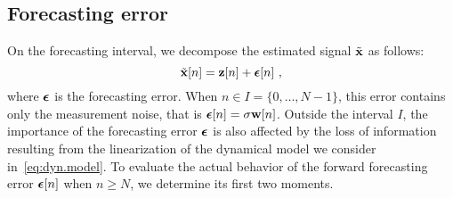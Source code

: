 \subsection{Forecasting error}
On the forecasting interval, we decompose the estimated signal $\tilde{{\mathbf x}}$ as follows:
\begin{equation}
\tilde \bx[n] = \bz[n] + \bepsilon[n]\ ,
\label{eq:forecasting.error}
\end{equation}
where $\boldsymbol{\epsilon}$ is the forecasting error. When $n\in I=\{0,\dots,N-1\}$, this error contains only the measurement noise, that is $\boldsymbol{\epsilon}[n]=\sigma{\mathbf w}[n]$. Outside the interval $I$, the importance of the forecasting error $\boldsymbol{\epsilon}$ is also affected by the loss of information resulting from the linearization of the dynamical model we consider in~\eqref{eq:dyn.model}. To evaluate the actual behavior of the forward forecasting error $\boldsymbol{\epsilon}[n]$ when $n\geq N$, we determine its first two moments.
